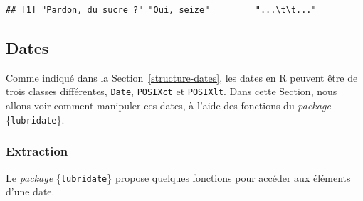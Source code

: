 \documentclass[
  11pt,
]{book}
\numberwithin{equation}{section}
\numberwithin{countremarque}{section}
\begin{document}
\begin{lstlisting}
## [1] "Pardon, du sucre ?" "Oui, seize"         "...\t\t..."
\end{lstlisting}

\hypertarget{dates-1}{%
\subsection{Dates}\label{dates-1}}

Comme indiqué dans la Section~\ref{structure-dates}, les dates en R peuvent être de trois classes différentes, \texttt{Date}, \texttt{POSIXct} et \texttt{POSIXlt}. Dans cette Section, nous allons voir comment manipuler ces dates, à l'aide des fonctions du \emph{package} \{\texttt{lubridate}\}.

\hypertarget{extraction}{%
\subsubsection{Extraction}\label{extraction}}

Le \emph{package} \{\texttt{lubridate}\} propose quelques fonctions pour accéder aux éléments d'une date.
\end{document}
